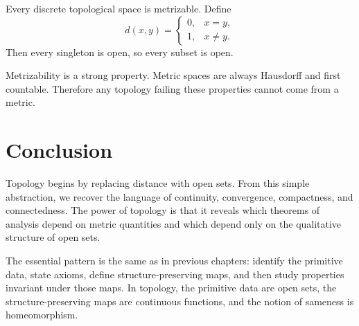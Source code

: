 \begin{example}
Every discrete topological space is metrizable. Define
\[
    d(x,y)=
    \begin{cases}
    0,&x=y,\\
    1,&x\neq y.
    \end{cases}
\]
Then every singleton is open, so every subset is open.
\end{example}

\begin{remark}
Metrizability is a strong property. Metric spaces are always Hausdorff and first countable. Therefore any topology failing these properties cannot come from a metric.
\end{remark}

\section{Conclusion}

Topology begins by replacing distance with open sets. From this simple abstraction, we recover the language of continuity, convergence, compactness, and connectedness. The power of topology is that it reveals which theorems of analysis depend on metric quantities and which depend only on the qualitative structure of open sets.

The essential pattern is the same as in previous chapters: identify the primitive data, state axioms, define structure-preserving maps, and then study properties invariant under those maps. In topology, the primitive data are open sets, the structure-preserving maps are continuous functions, and the notion of sameness is homeomorphism.
